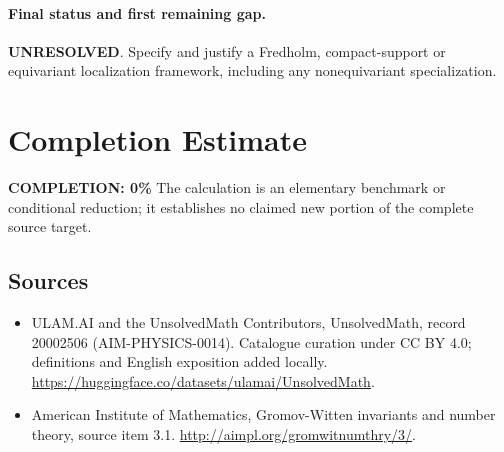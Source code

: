 \documentclass[11pt]{article}
\begin{document}
\paragraph{Final status and first remaining gap.}
\textbf{UNRESOLVED}. Specify and justify a Fredholm, compact-support or equivariant localization framework, including any nonequivariant specialization.

\section{Completion Estimate}
\noindent\textbf{COMPLETION: 0\%}
The calculation is an elementary benchmark or conditional reduction; it establishes no claimed new portion of the complete source target.

\subsection{Sources}
\begin{itemize}
\item[\hypertarget{source:20002506:1}{S1}] ULAM.AI and the UnsolvedMath Contributors, UnsolvedMath, record 20002506 (AIM-PHYSICS-0014). Catalogue curation under CC BY 4.0; definitions and English exposition added locally.
\url{https://huggingface.co/datasets/ulamai/UnsolvedMath}.
\item[\hypertarget{source:20002506:2}{S2}] American Institute of Mathematics, Gromov-Witten invariants and number theory, source item 3.1.
\url{http://aimpl.org/gromwitnumthry/3/}.
\end{itemize}
\label{end:20002506}
\end{document}
